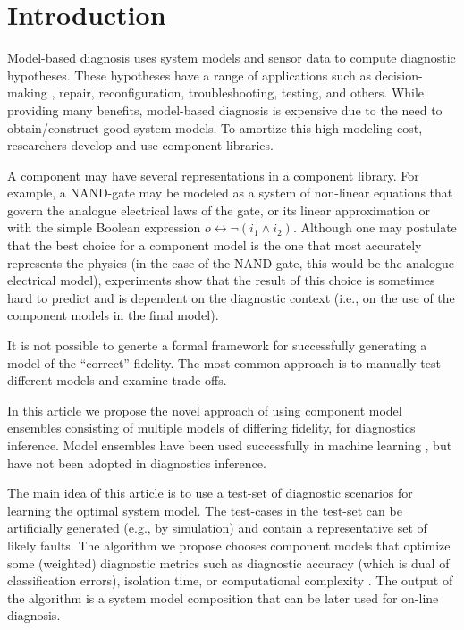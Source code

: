 \section{Introduction}
%
Model-based diagnosis \citep{dekleer87diagnosing} uses system models
and sensor data to compute diagnostic hypotheses. These hypotheses
have a range of applications such as decision-making
\citep{feldman13genius}, repair, reconfiguration, troubleshooting,
testing, and others. While providing many benefits, model-based
diagnosis is expensive due to the need to obtain/construct good system
models. To amortize this high modeling cost, researchers develop and
use component libraries.
\par
A component may have several representations in a component
library. For example, a NAND-gate may be modeled as a system of
non-linear equations that govern the analogue electrical laws of the
gate, or its linear approximation or with the simple Boolean
expression $o \leftrightarrow \neg(i_1 \wedge i_2)$. Although one may
postulate that the best choice for a component model is the one that
most accurately represents the physics (in the case of the NAND-gate,
this would be the analogue electrical model), experiments show that
the result of this choice is sometimes hard to predict and is
dependent on the diagnostic context (i.e., on the use of the component
models in the final model).
\par
It is not possible to generte a formal framework for successfully
generating a model of the ``correct'' fidelity. The most common
approach is to manually test different models and examine trade-offs.
\par
In this article we propose the novel approach of using component model
ensembles consisting of multiple models of differing fidelity, for
diagnostics inference. Model ensembles have been used successfully in
machine learning \citep{brown2010ensemble,dietterich2000ensemble}, but
have not been adopted in diagnostics inference.
\par
The main idea of this article is to use a test-set of diagnostic
scenarios for learning the optimal system model. The test-cases in the
test-set can be artificially generated (e.g., by simulation) and
contain a representative set of likely faults. The algorithm we
propose chooses component models that optimize some (weighted)
diagnostic metrics such as diagnostic accuracy (which is dual of
classification errors), isolation time, or computational complexity
\citep{feldman10empirical}. The output of the algorithm is a system
model composition that can be later used for on-line diagnosis.
